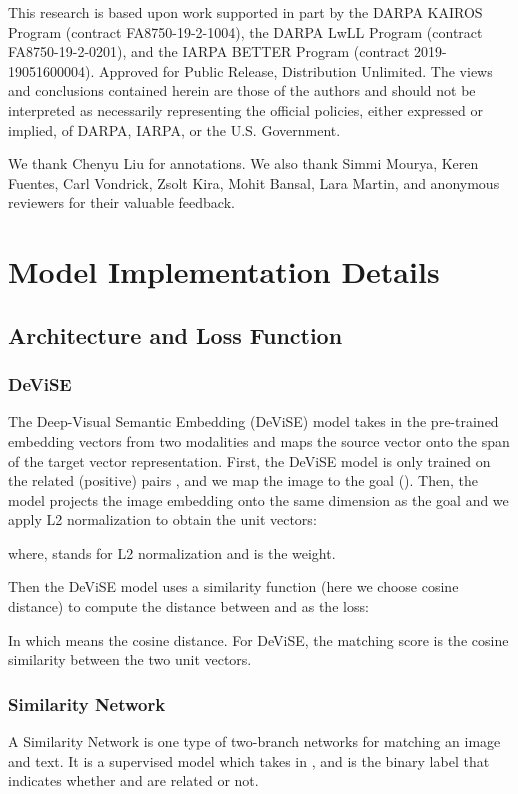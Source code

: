 \documentclass[11pt]{article}
\begin{document}
This research is based upon work supported in part by the DARPA KAIROS Program (contract FA8750-19-2-1004), the DARPA LwLL Program (contract FA8750-19-2-0201), and the IARPA BETTER Program (contract 2019-19051600004). Approved for Public Release, Distribution Unlimited. The views and conclusions contained herein are those of the authors and should not be interpreted as necessarily representing the official policies, either expressed or implied, of DARPA, IARPA, or the U.S. Government.

We thank Chenyu Liu for annotations. We also thank Simmi Mourya, Keren Fuentes, Carl Vondrick, Zsolt Kira, Mohit Bansal, Lara Martin, and anonymous reviewers for their valuable feedback. 




\clearpage

\newpage

\appendix
\section{Model Implementation Details}
\subsection{Architecture and Loss Function}
\subsubsection{DeViSE}
The Deep-Visual Semantic Embedding (DeViSE) model takes in the pre-trained embedding vectors from two modalities and maps the source vector onto the span of the target vector representation. First, the DeViSE model is only trained on the related (positive) pairs , and we map the image to the goal (). Then, the model projects the image embedding onto the same dimension as the goal and we apply L2 normalization to obtain the unit vectors:

where,  stands for L2 normalization and  is the weight. 

Then the DeViSE model uses a similarity function (here we choose cosine distance) to compute the distance between  and  as the loss:

In which  means the cosine distance. For DeViSE, the matching score is the cosine similarity between the two unit vectors.

\subsubsection{Similarity Network}
A Similarity Network is one type of two-branch networks for matching an image and text. It is a supervised model which takes in , and  is the binary label that indicates whether  and  are related or not.
\end{document}
